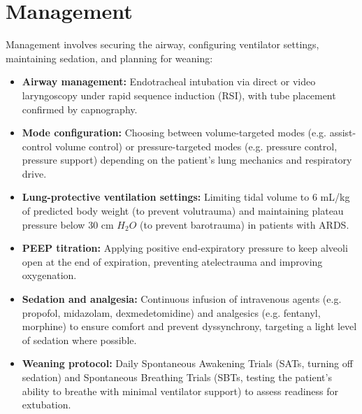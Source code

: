 \section*{Management}
Management involves securing the airway, configuring ventilator settings, maintaining sedation, and planning for weaning:
\begin{itemize}
    \item \textbf{Airway management:} Endotracheal intubation via direct or video laryngoscopy under rapid sequence induction (RSI), with tube placement confirmed by capnography.
    \item \textbf{Mode configuration:} Choosing between volume-targeted modes (e.g. assist-control volume control) or pressure-targeted modes (e.g. pressure control, pressure support) depending on the patient's lung mechanics and respiratory drive.
    \item \textbf{Lung-protective ventilation settings:} Limiting tidal volume to 6 mL/kg of predicted body weight (to prevent volutrauma) and maintaining plateau pressure below 30 cm $H_2O$ (to prevent barotrauma) in patients with ARDS.
    \item \textbf{PEEP titration:} Applying positive end-expiratory pressure to keep alveoli open at the end of expiration, preventing atelectrauma and improving oxygenation.
    \item \textbf{Sedation and analgesia:} Continuous infusion of intravenous agents (e.g. propofol, midazolam, dexmedetomidine) and analgesics (e.g. fentanyl, morphine) to ensure comfort and prevent dyssynchrony, targeting a light level of sedation where possible.
    \item \textbf{Weaning protocol:} Daily Spontaneous Awakening Trials (SATs, turning off sedation) and Spontaneous Breathing Trials (SBTs, testing the patient's ability to breathe with minimal ventilator support) to assess readiness for extubation.
\end{itemize}


